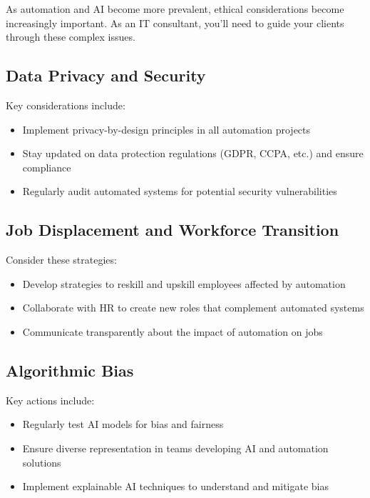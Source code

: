 As automation and AI become more prevalent, ethical considerations become increasingly important. As an IT consultant, you'll need to guide your clients through these complex issues.

\subsection{Data Privacy and Security}

Key considerations include:

\begin{itemize}
    \item Implement privacy-by-design principles in all automation projects
    \item Stay updated on data protection regulations (GDPR, CCPA, etc.) and ensure compliance
    \item Regularly audit automated systems for potential security vulnerabilities
\end{itemize}

\subsection{Job Displacement and Workforce Transition}

Consider these strategies:

\begin{itemize}
    \item Develop strategies to reskill and upskill employees affected by automation
    \item Collaborate with HR to create new roles that complement automated systems
    \item Communicate transparently about the impact of automation on jobs
\end{itemize}

\subsection{Algorithmic Bias}

Key actions include:

\begin{itemize}
    \item Regularly test AI models for bias and fairness
    \item Ensure diverse representation in teams developing AI and automation solutions
    \item Implement explainable AI techniques to understand and mitigate bias
\end{itemize}

